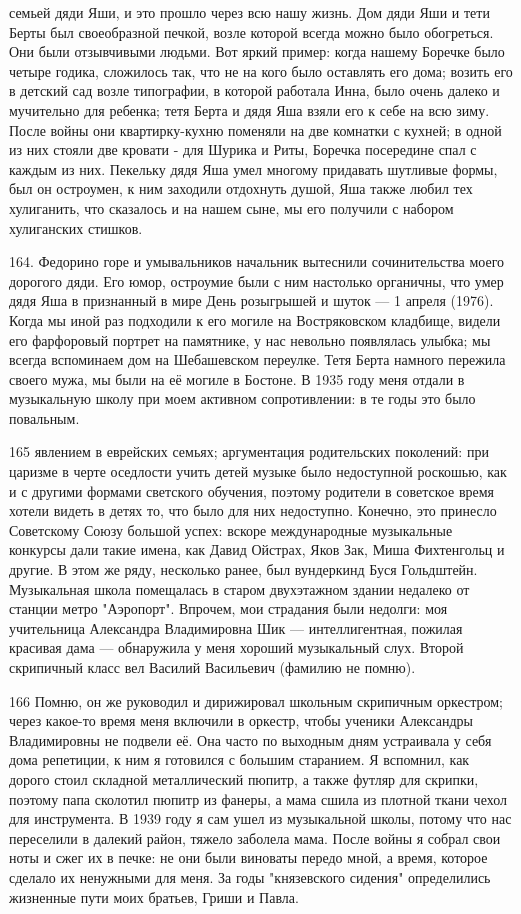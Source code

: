 семьей дяди Яши, и это прошло через всю нашу жизнь. Дом дяди Яши и тети Берты был своеобразной печкой, возле которой всегда можно было обогреться. Они были отзывчивыми людьми. Вот яркий пример: когда нашему Боречке было четыре годика, сложилось так, что не на кого было оставлять его дома; возить его в детский сад возле типографии, в которой работала Инна, было очень далеко и мучительно для ребенка; тетя Берта и дядя Яша взяли его к себе на всю зиму. После войны они квартирку-кухню поменяли на две комнатки с кухней; в одной из них стояли две кровати - для Шурика и Риты, Боречка посередине спал с каждым из них. Пекельку дядя Яша умел многому придавать шутливые формы, был он остроумен, к ним заходили отдохнуть душой, Яша также любил тех хулиганить, что сказалось и на нашем сыне, мы его получили с набором хулиганских стишков.

164. Федорино горе и умывальников начальник вытеснили сочинительства моего дорогого дяди. Его юмор, остроумие были с ним настолько органичны, что умер дядя Яша в признанный в мире День розыгрышей и шуток — 1 апреля (1976). Когда мы иной раз подходили к его могиле на Востряковском кладбище, видели его фарфоровый портрет на памятнике, у нас невольно появлялась улыбка; мы всегда вспоминаем дом на Шебашевском переулке. Тетя Берта намного пережила своего мужа, мы были на её могиле в Бостоне. В 1935 году меня отдали в музыкальную школу при моем активном сопротивлении: в те годы это было повальным.

165 явлением в еврейских семьях; аргументация родительских поколений: при царизме в черте оседлости учить детей музыке было недоступной роскошью, как и с другими формами светского обучения, поэтому родители в советское время хотели видеть в детях то, что было для них недоступно. Конечно, это принесло Советскому Союзу большой успех: вскоре международные музыкальные конкурсы дали такие имена, как Давид Ойстрах, Яков Зак, Миша Фихтенгольц и другие. В этом же ряду, несколько ранее, был вундеркинд Буся Гольдштейн. Музыкальная школа помещалась в старом двухэтажном здании недалеко от станции метро "Аэропорт". Впрочем, мои страдания были недолги: моя учительница Александра Владимировна Шик — интеллигентная, пожилая красивая дама — обнаружила у меня хороший музыкальный слух. Второй скрипичный класс вел Василий Васильевич (фамилию не помню).

166
Помню, он же руководил и дирижировал школьным скрипичным оркестром; через какое-то время меня включили в оркестр, чтобы ученики Александры Владимировны не подвели её. Она часто по выходным дням устраивала у себя дома репетиции, к ним я готовился с большим старанием.
Я вспомнил, как дорого стоил складной металлический пюпитр, а также футляр для скрипки, поэтому папа сколотил пюпитр из фанеры, а мама сшила из плотной ткани чехол для инструмента.
В 1939 году я сам ушел из музыкальной школы, потому что нас переселили в далекий район, тяжело заболела мама. После войны я собрал свои ноты и сжег их в печке: не они были виноваты передо мной, а время, которое сделало их ненужными для меня.
За годы "князевского сидения" определились жизненные пути моих братьев, Гриши и Павла.

